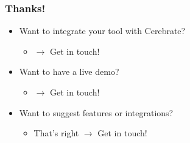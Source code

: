 \begin{frame}
\frametitle{Thanks!}
    \begin{itemize}
        \item Want to integrate your tool with Cerebrate?
        \begin{itemize}
            \item[ ] $\rightarrow$ Get in touch!
        \end{itemize}
        \item Want to have a live demo?
        \begin{itemize}
            \item[ ] $\rightarrow$ Get in touch!
        \end{itemize}
        \item Want to suggest features or integrations?
        \begin{itemize}
            \item[ ] That's right $\rightarrow$ Get in touch!
        \end{itemize}
    \end{itemize}
\end{frame}